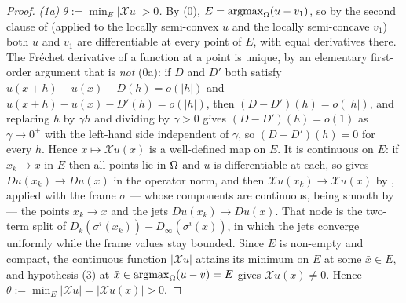 \begin{proof}
\emph{(1a) $\theta:=\min_E|\mathcal Xu|>0$.} By (0), $E=\operatorname*{argmax}_\Omega(u-v_1)$, so by the
second clause of  (applied to the locally semi-convex $u$ and
the locally semi-concave $v_1$) both $u$ and $v_1$ are differentiable at every point of $E$,
with equal derivatives there. The Fr\'echet derivative of a function at a point is unique,
by an elementary first-order argument that is \emph{not} (0a): if $D$ and $D'$ both satisfy
$u(x+h)-u(x)-D(h)=o(|h|)$ and $u(x+h)-u(x)-D'(h)=o(|h|)$, then $(D-D')(h)=o(|h|)$, and
replacing $h$ by $\gamma h$ and dividing by $\gamma>0$ gives $(D-D')(h)=o(1)$ as
$\gamma\to0^{+}$ with the left-hand side independent of $\gamma$, so $(D-D')(h)=0$ for
every $h$. Hence $x\mapsto\mathcal Xu(x)$ is a well-defined map on $E$. It is continuous on $E$: if
$x_k\to x$ in $E$ then all points lie in $\Omega$ and $u$ is differentiable at each, so
 gives $Du(x_k)\to Du(x)$ in the operator norm, and then
$\mathcal Xu(x_k)\to\mathcal Xu(x)$ by , applied with the
frame $\sigma$ --- whose components are continuous, being smooth by
 --- the points $x_k\to x$ and the jets $Du(x_k)\to Du(x)$. That node
is the two-term split of $D_k(\sigma^{i}(x_k))-D_\infty(\sigma^{i}(x))$, in which the jets
converge uniformly while the frame values stay bounded. Since $E$ is non-empty and
compact, the continuous function $|\mathcal Xu|$ attains its minimum on $E$ at some
$\bar x\in E$, and hypothesis (3) at $\bar x\in\operatorname*{argmax}_\Omega(u-v)=E$ gives
$\mathcal Xu(\bar x)\ne0$. Hence $\theta:=\min_E|\mathcal Xu|=|\mathcal Xu(\bar x)|>0$.


\end{proof}
